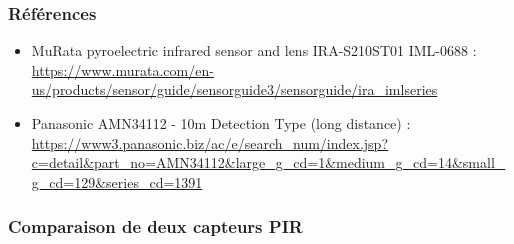 \documentclass{article}
\begin{document}
        \subsubsection{Références}
        \begin{itemize}
            \item MuRata pyroelectric infrared sensor and lens IRA-S210ST01 IML-0688 : \url{https://www.murata.com/en-us/products/sensor/guide/sensorguide3/sensorguide/ira_imlseries}
            \item Panasonic AMN34112 - 10m Detection Type (long distance) : \url{https://www3.panasonic.biz/ac/e/search_num/index.jsp?c=detail&part_no=AMN34112&large_g_cd=1&medium_g_cd=14&small_g_cd=129&series_cd=1391}
        \end{itemize}

        \subsubsection{Comparaison de deux capteurs PIR}
\end{document}
